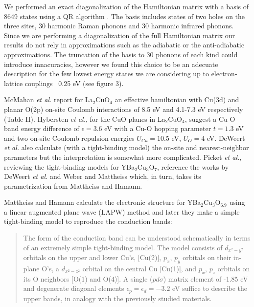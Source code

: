We performed an exact diagonalization of the Hamiltonian matrix with a basis of 8649 states using a QR algorithm \cite{eigenweb}. The basis includes states of two holes on the three sites, 30 harmonic Raman phonons and 30 harmonic infrared phonons. Since we are performing a diagonalization of the full Hamiltonian matrix our results do not rely in approximations such as the adiabatic or the anti-adiabatic approximations. The  truncation of the basis to 30 phonons of each kind could introduce innacuracies, however we found this choice to be an adecuate description for the few lowest energy states we are considering up to electron-lattice couplings ~0.25 eV (see figure 3).

McMahan \textit{et al.}\cite{McMahan1988} report for La$_{2}$CuO$_{4}$ an effective hamiltonian with Cu(3d) and planar O(2p) on-site Coulomb interactions of 8.5 eV and 4.1-7.3 eV respectively (Table II). Hybersten \textit{et al.}\cite{Hybertsen1989}, for the CuO planes in La$_{2}$CuO$_{4}$, suggest a Cu-O band energy difference of $\epsilon = 3.6$ eV with a Cu-O hopping parameter $t = 1.3$ eV and two on-site Coulomb repulsion energies $U_{Cu} = 10.5$ eV, $U_O = 4$ eV. DeWeert \textit{et al.}\cite{DeWeert1989} also calculate (with a tight-binding model) the on-site and nearest-neighbor parameters but the interpretation is somewhat more complicated. Picket \textit{et al.}\cite{Pickett1989}, reviewing the tight-binding models for YBa$_{2}$Cu$_{3}$O$_{7}$, reference the works by DeWeert \textit{et al.}\cite{DeWeert1989} and Weber and Mattheiss\cite{Weber1988} which, in turn, takes its parametrization from Mattheiss and Hamann\cite{Mattheiss1987}.

Mattheiss and Hamann\cite{Mattheiss1987} calculate the electronic structure for YBa$_{2}$Cu$_{3}$O$_{6.9}$ using a linear augmented plane wave (LAPW) method and later they make a simple tight-binding model to reproduce the conduction bands:

\begin{quote}The form of the conduction band can be understood schematically in terms of an extremely simple tight-binding model. The model consists of $d_{x^2-y^2}$ orbitals on the upper and lower Cu's, [Cu(2)], $p_x$, $p_y$ orbitals on their in-plane O's, a $d_{x^2-z^2}$ orbital on the central Cu [Cu(1)], and $p_x$, $p_z$ orbitals on its O neighbors [O(1) and O(4)]. A single ($pd\sigma$) matrix element of -1.85 eV and degenerate diagonal elements $\epsilon_p = \epsilon_d=-3.2$ eV suffice to describe the upper bands, in analogy with the previously studied materials.
\end{quote}

